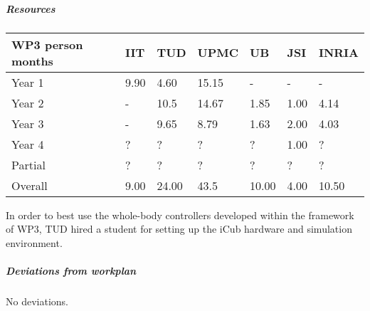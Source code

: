 
\subparagraph{Resources}

\begin{center}
\begin{tabular}{|C{1.5cm}|C{1.5cm}|C{1.5cm}|C{2cm}|C{2cm}|C{2cm}|C{2cm}|}
\hline
\footnotesize \textbf{WP3 person months} & \footnotesize \textbf{IIT}&\footnotesize \textbf{TUD}&\footnotesize \textbf{UPMC}& \footnotesize \textbf{UB} &\footnotesize \textbf{JSI} &\footnotesize \textbf{INRIA} \\ \hline
\footnotesize Year 1  &  9.90 & 4.60  & 15.15 & -    & -    &  -   \\  \hline
\footnotesize Year 2  &  -    & 10.5  & 14.67 & 1.85 & 1.00 & 4.14  \\  \hline
\footnotesize Year 3  &  -    & 9.65  & 8.79  & 1.63 & 2.00 & 4.03 \\  \hline
\footnotesize Year 4  & ?     & ?     & ?     & ?    & 1.00 & ?    \\   	\hline
\footnotesize Partial & ?     & ?    & ?    & ?    & ?    & ?    \\
\hline \hline
\footnotesize Overall &  9.00 & 24.00 & 43.5 & 10.00 & 4.00 & 10.50 \\ \hline
\end{tabular}
\end{center}

In order to best use the whole-body controllers developed within the framework of WP3, TUD hired a student for setting up the iCub hardware and simulation environment.

\subparagraph*{Deviations from workplan}

No deviations.

